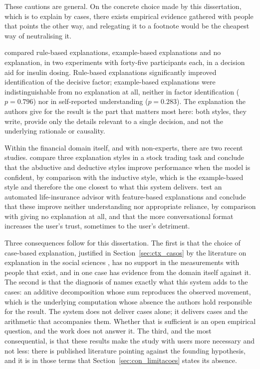 These cautions are general. On the concrete choice made by this dissertation, which is to explain by
cases, there exists empirical evidence gathered with people that points the other way, and
relegating it to a footnote would be the cheapest way of neutralising it.

\textcite{waa2021xai} compared rule-based explanations, example-based explanations and no
explanation, in two experiments with forty-five participants each, in a decision aid for insulin
dosing. Rule-based explanations significantly improved identification of the decisive factor;
example-based explanations were indistinguishable from no explanation at all, neither in factor
identification ($p = 0.796$) nor in self-reported understanding ($p = 0.283$). The explanation the
authors give for the result is the part that matters most here: both styles, they write, provide
only the details relevant to a single decision, and not the underlying rationale or causality.

Within the financial domain itself, and with non-experts, there are two recent studies.
\textcite{cau2023logicstyle} compare three explanation styles in a stock trading task and conclude
that the abductive and deductive styles improve performance when the model is confident, by
comparison with the inductive style, which is the example-based style and therefore the one closest
to what this system delivers. \textcite{bertrand2023featurebased} test an automated life-insurance
advisor with feature-based explanations and conclude that these improve neither understanding nor
appropriate reliance, by comparison with giving no explanation at all, and that the more
conversational format increases the user's trust, sometimes to the user's detriment.

Three consequences follow for this dissertation. The first is that the choice of case-based
explanation, justified in Section~\ref{sec:ctx_casos} by the literature on explanation in the
social sciences \autocite{miller2019explanation}, has no support in the measurements with people
that exist, and in one case has evidence from the domain itself against it. The second is that the
diagnosis of \textcite{waa2021xai} names exactly what this system adds to the cases: an additive
decomposition whose sum reproduces the observed movement, which is the underlying computation whose
absence the authors hold responsible for the result. The system does not deliver cases alone; it
delivers cases and the arithmetic that accompanies them. Whether that is sufficient is an open
empirical question, and the work does not answer it. The third, and the most consequential, is that
these results make the study with users more necessary and not less: there is published literature
pointing against the founding hypothesis, and it is in those terms that
Section~\ref{sec:con_limitacoes} states its absence.

